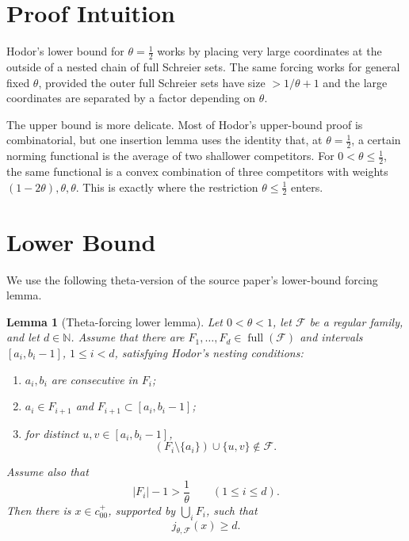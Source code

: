 \documentclass[11pt]{article}
\newtheorem{lemma}{Lemma}
\newcommand{\N}{\mathbb N}
\newcommand{\cF}{\mathcal F}
\newcommand{\full}{\operatorname{full}}
\begin{document}
\section*{Proof Intuition}

Hodor's lower bound for \(\theta=\frac12\) works by placing very large
coordinates at the outside of a nested chain of full Schreier sets.  The same
forcing works for general fixed \(\theta\), provided the outer full Schreier
sets have size \(>1/\theta+1\) and the large coordinates are separated by a
factor depending on \(\theta\).

The upper bound is more delicate.  Most of Hodor's upper-bound proof is
combinatorial, but one insertion lemma uses the identity that, at
\(\theta=\frac12\), a certain norming functional is the average of two
shallower competitors.  For \(0<\theta\leq\frac12\), the same functional is a
convex combination of three competitors with weights
\((1-2\theta),\theta,\theta\).  This is exactly where the restriction
\(\theta\leq\frac12\) enters.

\section*{Lower Bound}

We use the following theta-version of the source paper's lower-bound forcing
lemma.

\begin{lemma}[Theta-forcing lower lemma]
\label{lem:theta-lower}
Let \(0<\theta<1\), let \(\cF\) be a regular family, and let \(d\in\N\).
Assume that there are \(F_1,\ldots,F_d\in\full(\cF)\) and intervals
\([a_i,b_i-1]\), \(1\leq i<d\), satisfying Hodor's nesting conditions:
\begin{enumerate}
\item \(a_i,b_i\) are consecutive in \(F_i\);
\item \(a_i\in F_{i+1}\) and \(F_{i+1}\subset [a_i,b_i-1]\);
\item for distinct \(u,v\in [a_i,b_i-1]\),
\[
  (F_i\setminus\{a_i\})\cup\{u,v\}\notin\cF.
\]
\end{enumerate}
Assume also that
\[
  |F_i|-1>\frac1\theta \qquad (1\leq i\leq d).
\]
Then there is \(x\in c_{00}^+\), supported by \(\bigcup_i F_i\), such that
\[
  j_{\theta,\cF}(x)\geq d.
\]
\end{lemma}
\end{document}

